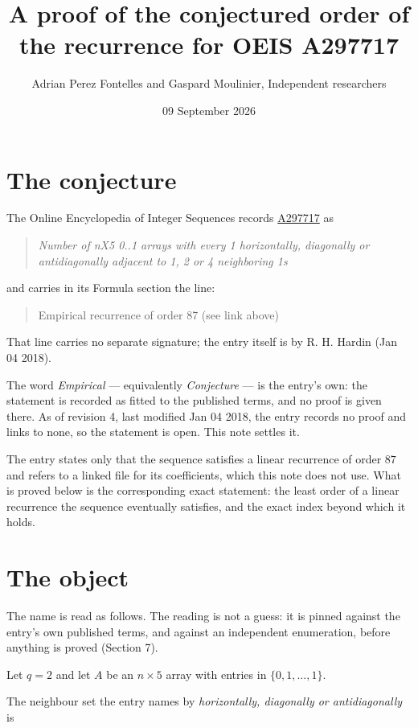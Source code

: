 \documentclass[11pt]{article}
\title{A proof of the conjectured order of the recurrence for OEIS A297717}
\author{Adrian Perez Fontelles and Gaspard Moulinier, Independent researchers}
\date{09 September 2026}
\theoremstyle{definition}
\begin{document}
\maketitle
\section{The conjecture}

The Online Encyclopedia of Integer Sequences records \href{https://oeis.org/A297717}{A297717} as

\begin{quote}\itshape Number of nX5 0..1 arrays with every 1 horizontally, diagonally or antidiagonally adjacent to 1, 2 or 4 neighboring 1s\end{quote}

and carries in its Formula section the line:

\begin{quote}\ttfamily Empirical recurrence of order 87 (see link above)\end{quote}

That line carries no separate signature; the entry itself is by R. H. Hardin (Jan 04 2018).

The word {\itshape Empirical} --- equivalently {\itshape Conjecture} --- is the entry's own: the statement is recorded as fitted to the published terms, and no proof is given there. As of revision 4, last modified Jan 04 2018, the entry records no proof and links to none, so the statement is open. This note settles it.

The entry states only that the sequence satisfies a linear recurrence of order $87$ and refers to a linked file for its coefficients, which this note does not use. What is proved below is the corresponding exact statement: the least order of a linear recurrence the sequence eventually satisfies, and the exact index beyond which it holds.

\section{The object}

The name is read as follows. The reading is not a guess: it is pinned against the entry's own published terms, and against an independent enumeration, before anything is proved (Section 7).

Let $q = 2$ and let $A$ be an $n \times 5$ array with entries in $\{0,1,\dots,1\}$.

The neighbour set the entry names by {\itshape horizontally, diagonally or antidiagonally} is
\end{document}
